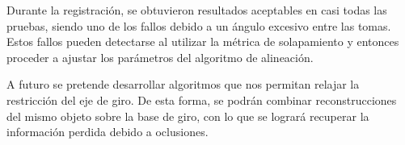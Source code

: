 		Durante la registración, se obtuvieron resultados aceptables en casi todas las pruebas, 
		siendo uno de los fallos debido a un ángulo excesivo entre las tomas.
		Estos fallos pueden detectarse al utilizar la métrica de solapamiento y entonces proceder
		a ajustar los parámetros del algoritmo de alineación.

		A futuro se pretende desarrollar algoritmos que nos permitan relajar la
		restricción del eje de giro.
		De esta forma, se podrán combinar reconstrucciones del mismo objeto
		sobre la base de giro, con lo que se logrará recuperar la información
		perdida debido a oclusiones.

